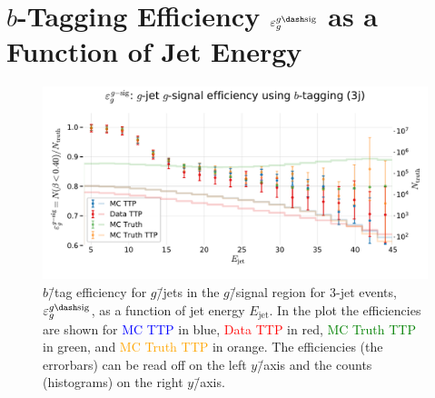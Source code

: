\section[b-tag Efficiency for g-Jets in the g-Signal Region for 3-jet events]{$b$-Tagging Efficiency $\varepsilon_g^{g\dash\mathrm{sig}}$ as a Function of Jet Energy}
\begin{figure}
  \centerfloat
  \includegraphics[width=1.1\textwidth, trim=20 30 0 40, clip]{figures/quarks/eff_g_gsig-down_sample=1.00-ML_vars=vertex-selection=b-ejet_min=4-n_iter_RS_lgb=99-n_iter_RS_xgb=9-cdot_cut=0.90-version=19.pdf}
  \vspace{-3mm}
  \caption[$b$\=/Tagging Efficiency $\varepsilon_g^{g\dash\mathrm{sig}}$ as a Function of Jet Energy]
          {$b$\=/tag efficiency for $g$\=/jets in the $g$\=/signal region for 3-jet events, $\varepsilon_g^{g\dash\mathrm{sig}}$, as a function of jet energy $E_\mathrm{jet}$. In the plot the efficiencies are shown for \textcolor{blue}{MC TTP} in blue, \textcolor{red}{Data TTP} in red, \textcolor{green}{MC Truth TTP} in green, and \textcolor{orange}{MC Truth TTP} in orange. The efficiencies (the errorbars) can be read off on the left $y$\=/axis and the counts (histograms) on the right $y$\=/axis.} 
\end{figure}
\clearpage

\FloatBarrier
